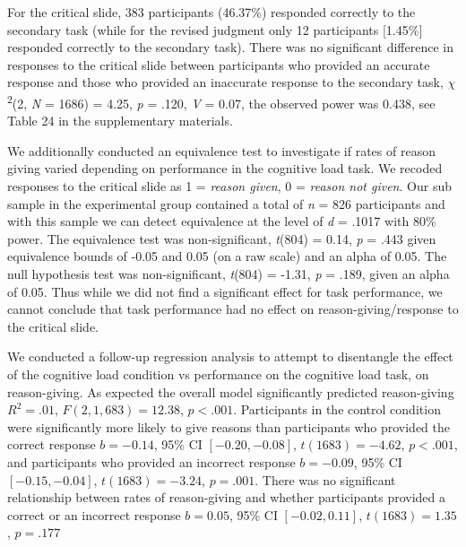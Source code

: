 \documentclass[
  man,floatsintext]{apa6}
\begin{document}
For the critical slide, 383 participants (46.37\%) responded correctly to the secondary task (while for the revised judgment only 12 participants {[}1.45\%{]} responded correctly to the secondary task). There was no significant difference in responses to the critical slide between participants who provided an accurate response and those who provided an inaccurate response to the secondary task, \(\chi\)\textsuperscript{2}(2, \emph{N} = 1686) = 4.25, \emph{p} = .120, \emph{V} = 0.07, the observed power was 0.438, see Table 24 in the supplementary materials.

We additionally conducted an equivalence test to investigate if rates of reason giving varied depending on performance in the cognitive load task. We recoded responses to the critical slide as 1 = \emph{reason given}, 0 = \emph{reason not given}. Our sub sample in the experimental group contained a total of \emph{n} = 826 participants and with this sample we can detect equivalence at the level of \emph{d} = .1017 with 80\% power. The equivalence test was non-significant, \emph{t}(804) = 0.14, \emph{p} = .443 given equivalence bounds of -0.05 and 0.05 (on a raw scale) and an alpha of 0.05. The null hypothesis test was non-significant, \emph{t}(804) = -1.31, \emph{p} = .189, given an alpha of 0.05. Thus while we did not find a significant effect for task performance, we cannot conclude that task performance had no effect on reason-giving/response to the critical slide.

We conducted a follow-up regression analysis to attempt to disentangle the effect of the cognitive load condition vs performance on the cognitive load task, on reason-giving. As expected the overall model significantly predicted reason-giving \(R^2 = .01\), \(F(2, 1,683) = 12.38\), \(p < .001\). Participants in the control condition were significantly more likely to give reasons than participants who provided the correct response \(b = -0.14\), 95\% CI \([-0.20, -0.08]\), \(t(1683) = -4.62\), \(p < .001\), and participants who provided an incorrect response \(b = -0.09\), 95\% CI \([-0.15, -0.04]\), \(t(1683) = -3.24\), \(p = .001\). There was no significant relationship between rates of reason-giving and whether participants provided a correct or an incorrect response \(b = 0.05\), 95\% CI \([-0.02, 0.11]\), \(t(1683) = 1.35\), \(p = .177\)

\newpage
\end{document}
